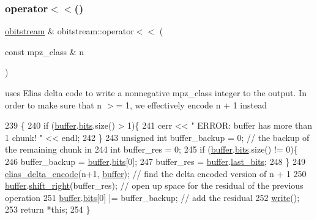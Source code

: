 \subsubsection{\texorpdfstring{operator$<$$<$()}{operator<<()}\hspace{0.1cm}{\footnotesize\ttfamily [2/2]}}
{\footnotesize\ttfamily \hyperlink{classobitstream}{obitstream} \& obitstream\+::operator$<$$<$ (\begin{DoxyParamCaption}\item[{const mpz\+\_\+class \&}]{n }\end{DoxyParamCaption})}



uses Elias delta code to write a nonnegative mpz\+\_\+class integer to the output. In order to make sure that n $>$= 1, we effectively encode n + 1 instead 


\begin{DoxyCode}
239                                                       \{
240   \textcolor{keywordflow}{if} (\hyperlink{classobitstream_aeaccad00a395a404aa16472bfa052be3}{buffer}.\hyperlink{classbit__pipe_a86f38af1e9736b053728033490476b50}{bits}.size() > 1)\{
241     cerr << \textcolor{stringliteral}{" ERROR: buffer has more than 1 chunk! "} << endl;
242   \}
243   \textcolor{keywordtype}{unsigned} \textcolor{keywordtype}{int} buffer\_backup = 0; \textcolor{comment}{// the backup of the remaining chunk in }
244   \textcolor{keywordtype}{int} buffer\_res = 0; 
245   \textcolor{keywordflow}{if} (\hyperlink{classobitstream_aeaccad00a395a404aa16472bfa052be3}{buffer}.\hyperlink{classbit__pipe_a86f38af1e9736b053728033490476b50}{bits}.size() != 0)\{
246     buffer\_backup = \hyperlink{classobitstream_aeaccad00a395a404aa16472bfa052be3}{buffer}.\hyperlink{classbit__pipe_a86f38af1e9736b053728033490476b50}{bits}[0];
247     buffer\_res = \hyperlink{classobitstream_aeaccad00a395a404aa16472bfa052be3}{buffer}.\hyperlink{classbit__pipe_a0f3e84b02751803adaab499b5dad86fe}{last\_bits};
248   \}
249   \hyperlink{bitstream_8cpp_a63daa014203b9a5b2622a264cbfdff7b}{elias\_delta\_encode}(n+1, \hyperlink{classobitstream_aeaccad00a395a404aa16472bfa052be3}{buffer}); \textcolor{comment}{// find the delta encoded version of n + 1 }
250   \hyperlink{classobitstream_aeaccad00a395a404aa16472bfa052be3}{buffer}.\hyperlink{classbit__pipe_a341a1f62d728a67f730503ca722a7770}{shift\_right}(buffer\_res); \textcolor{comment}{// open up space for the residual of the previous
       operation}
251   \hyperlink{classobitstream_aeaccad00a395a404aa16472bfa052be3}{buffer}.\hyperlink{classbit__pipe_a86f38af1e9736b053728033490476b50}{bits}[0] |= buffer\_backup; \textcolor{comment}{// add the residual}
252   \hyperlink{classobitstream_a5ac23633932baad040856f0a33ee1ebf}{write}();
253   \textcolor{keywordflow}{return} *\textcolor{keyword}{this};
254 \}
\end{DoxyCode}
\mbox{\label{classobitstream_a5ac23633932baad040856f0a33ee1ebf}} 
